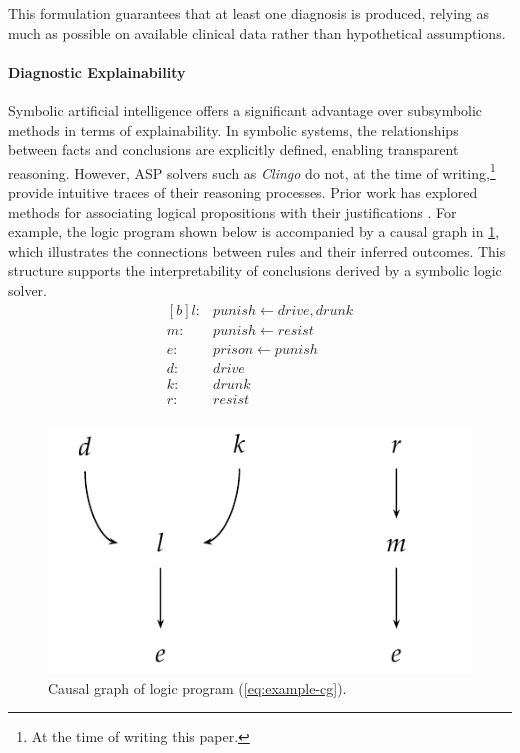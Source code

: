 \documentclass[10pt,leqno]{amsart}
\begin{document}
This formulation guarantees that at least one diagnosis is produced, 
relying as much as possible on available clinical data rather than hypothetical assumptions.

\paragraph{\textbf{Diagnostic Explainability}}

Symbolic artificial intelligence offers a significant advantage 
over subsymbolic methods in terms of explainability. 
In symbolic systems, the relationships between facts and conclusions are explicitly defined, 
enabling transparent reasoning. However, ASP solvers such as \textit{Clingo} do not, 
at the time of writing,\footnote{At the time of writing this paper.} 
provide intuitive traces of their reasoning processes. 
Prior work has explored methods for associating logical propositions 
with their justifications \cite{cabalar2014causal}. For example, 
the logic program shown below is accompanied by a causal graph 
in \cref{fig:causal-g}, which illustrates the connections 
between rules and their inferred outcomes. 
This structure supports the interpretability of conclusions derived by a symbolic logic solver.
\begin{equation}
\begin{aligned}[b]
    l :& punish \longleftarrow drive, drunk \\
    m :& punish \longleftarrow resist \\
    e :& prison \longleftarrow punish \\
    d :& drive \\
    k :& drunk \\
    r :& resist \\
\end{aligned}
\label{eq:example-cg}
\end{equation}
\begin{figure}
    \centering
    \includegraphics{assets/causal_g.pdf}
    \caption{Causal graph of logic program (\cref{eq:example-cg}).}
    \label{fig:causal-g}
\end{figure}
\end{document}

